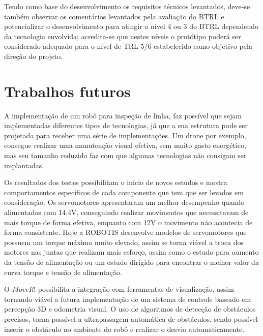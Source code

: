 Tendo como base do desenvolvimento os requisitos técnicos levantados, deve-se também observar os comentários levantados pela avaliação do BTRL e potencializar o desenvolvimento para atingir o nível 4 ou 3 do BTRL dependendo da tecnologia envolvida; acredita-se que nestes níveis o protótipo poderá ser considerado adequado para o nível de TRL 5/6 estabelecido como objetivo pela direção do projeto.

\section{Trabalhos futuros}
\label{sec:trabfut}
A implementação de um robô para inspeção de linha, faz possível que sejam implementadas diferentes tipos de tecnologias, já que a sua estrutura pode ser projetada para receber uma série de implementações. Um drone por exemplo, consegue realizar uma manutenção visual efetiva, sem muito gasto energético, mas seu tamanho reduzido faz com que algumas tecnologias não consigam ser implantadas.

Os resultados dos testes possibilitam o início de novos estudos e mostra comportamentos específicos de cada componente que tem que ser levados em consideração. Os servomotores apresentaram um melhor desempenho quando alimentados com 14.4V, conseguindo realizar movimentos que necessitavam de mais torque de forma efetiva, enquanto com 12V o movimento não acontecia de forma consistente. Hoje a ROBOTIS desenvolve modelos de servomotores que possuem um torque máximo muito elevado, assim se torna viável a troca dos motores nas juntas que realizam mais esforço, assim como o estudo para aumento da tensão de alimentação ou um estudo dirigido para encontrar o melhor valor da curva torque e tensão de alimentação.

O \textit{MoveIt}! possibilita a integração com ferramentas de visualização, assim tornando viável a futura implementação de um sistema de controle baseado em percepção 3D e odometria visual. O uso de algoritmos de detecção de obstáculos precisos, torna possível a ultrapassagem automática de obstáculos, sendo possível inserir o obstáculo no ambiente do robô e realizar o desvio automaticamente.







